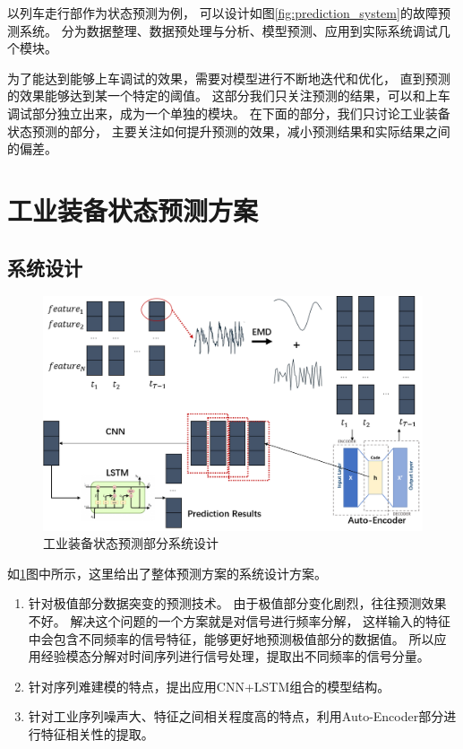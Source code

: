 以列车走行部作为状态预测为例，
可以设计如图\ref{fig:prediction_system}的故障预测系统。
分为数据整理、数据预处理与分析、模型预测、应用到实际系统调试几个模块。

为了能达到能够上车调试的效果，需要对模型进行不断地迭代和优化，
直到预测的效果能够达到某一个特定的阈值。
这部分我们只关注预测的结果，可以和上车调试部分独立出来，成为一个单独的模块。
在下面的部分，我们只讨论工业装备状态预测的部分，
主要关注如何提升预测的效果，减小预测结果和实际结果之间的偏差。

\section{工业装备状态预测方案}
\subsection{系统设计}

  \begin{figure}
    \centering
    \includegraphics[width=\linewidth]{figures/prediction_system.png}
    \caption{工业装备状态预测部分系统设计}
    \label{fig:prediction system}
  \end{figure}

  如\ref{fig:prediction system}图中所示，这里给出了整体预测方案的系统设计方案。
  \begin{enumerate}
    \item 针对极值部分数据突变的预测技术。
    由于极值部分变化剧烈，往往预测效果不好。
    解决这个问题的一个方案就是对信号进行频率分解，
    这样输入的特征中会包含不同频率的信号特征，能够更好地预测极值部分的数据值。
    所以应用经验模态分解对时间序列进行信号处理，提取出不同频率的信号分量。
    \item 针对序列难建模的特点，提出应用CNN+LSTM组合的模型结构。
    \item 针对工业序列噪声大、特征之间相关程度高的特点，利用Auto-Encoder部分进行特征相关性的提取。
  \end{enumerate}
  

